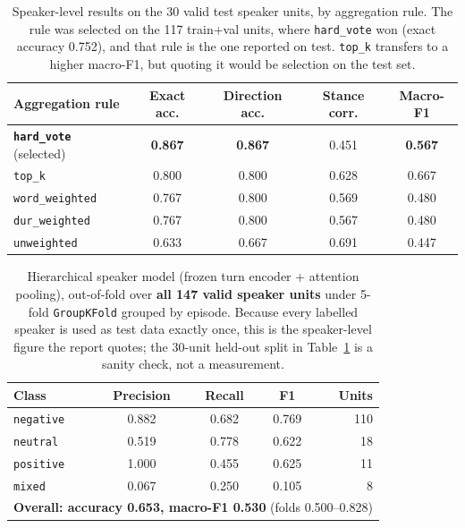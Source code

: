\documentclass[11pt,a4paper]{article}
\newcommand{\thd}[1]{\textbf{\sffamily\small #1}}          %
\begin{document}
\begin{table}[htbp]\centering
\caption{Speaker-level results on the 30 valid test speaker units, by aggregation rule. The rule
was selected on the 117 train+val units, where \texttt{hard\_vote} won (exact accuracy 0.752), and
that rule is the one reported on test. \texttt{top\_k} transfers to a higher macro-F1, but quoting
it would be selection on the test set.}\label{tab:aggrules}
\begin{tabular}{|l|c|c|c|c|}
\hline
\thd{Aggregation rule} & \thd{Exact acc.} & \thd{Direction acc.} & \thd{Stance corr.} & \thd{Macro-F1} \\ \hline
\textbf{\texttt{hard\_vote}} (selected) & \textbf{0.867} & \textbf{0.867} & 0.451 & \textbf{0.567} \\ \hline
\texttt{top\_k}         & 0.800 & 0.800 & 0.628 & 0.667 \\ \hline
\texttt{word\_weighted} & 0.767 & 0.800 & 0.569 & 0.480 \\ \hline
\texttt{dur\_weighted}  & 0.767 & 0.800 & 0.567 & 0.480 \\ \hline
\texttt{unweighted}     & 0.633 & 0.667 & 0.691 & 0.447 \\ \hline
\end{tabular}
\end{table}

\begin{table}[htbp]\centering
\caption{Hierarchical speaker model (frozen turn encoder + attention pooling), out-of-fold over
\textbf{all 147 valid speaker units} under 5-fold \texttt{GroupKFold} grouped by episode. Because
every labelled speaker is used as test data exactly once, this is the speaker-level figure the
report quotes; the 30-unit held-out split in Table~\ref{tab:aggrules} is a sanity check, not a measurement.}
\begin{tabular}{|l|c|c|c|r|}
\hline
\thd{Class} & \thd{Precision} & \thd{Recall} & \thd{F1} & \thd{Units} \\ \hline
\texttt{negative} & 0.882 & 0.682 & 0.769 & 110 \\ \hline
\texttt{neutral}  & 0.519 & 0.778 & 0.622 & 18 \\ \hline
\texttt{positive} & 1.000 & 0.455 & 0.625 & 11 \\ \hline
\texttt{mixed}    & 0.067 & 0.250 & 0.105 & 8 \\ \hline
\multicolumn{5}{|l|}{\textbf{Overall: accuracy 0.653, macro-F1 0.530} (folds 0.500--0.828)} \\ \hline
\end{tabular}
\end{table}
\end{document}
